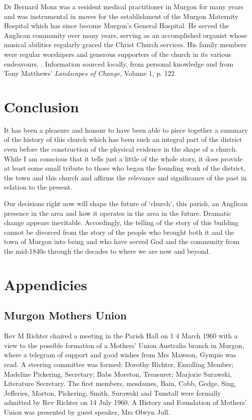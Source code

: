 Dr Bernard Monz was a resident medical practitioner in Murgon for many years and was instrumental in moves for the establishment of the Murgon Maternity Hospital which has since become Murgon's General Hospital. He served the Anglican community over many years, serving as an accomplished organist whose musical abilities regularly graced the Christ Church services. His family members were regular worshipers and generous supporters of the church in its various endeavours. . Information sourced locally, from personal knowledge and from Tony Matthews' \emph{Landscapes of Change,} Volume 1, p. 122

\hypertarget{conclusion}{%
\chapter{Conclusion}\label{conclusion}}

It has been a pleasure and honour to have been able to piece together a summary of the history of this church which has been such an integral part of the district even before the construction of the physical evidence in the shape of a church. While I am conscious that it tells just a little of the whole story, it does provide at least some small tribute to those who began the founding work of the district, the town and this church and affirms the relevance and significance of the past in relation to the present.

Our decisions right now will shape the future of `church', this parish, an Anglican presence in the area and how it operates in the area in the future. Dramatic change appears inevitable. Accordingly, the telling of the story of this building cannot be divorced from the story of the people who brought both it and the town of Murgon into being and who have served God and the community from the mid-1840s through the decades to where we are now and beyond.

\hypertarget{appendicies}{%
\chapter{Appendicies}\label{appendicies}}

\hypertarget{murgon-mothers-union}{%
\section{Murgon Mothers Union}\label{murgon-mothers-union}}

Rev M Richter chaired a meeting in the Parish Hall on 1 4 March 1960 with a view to the possible formation of a Mothers' Union Australia branch in Murgon, where a telegram of support and good wishes from Mrs Mawson, Gympie was read. A steering committee was formed: Dorothy Richter, Enrolling Member; Madeline Pickering, Secretary; Babs Moreton, Treasurer; Marjorie Surawski, Literature Secretary. The first members, mesdames, Bain, Cobb, Gedge, Sing, Jefferies, Morton, Pickering, Smith, Surawski and Tunstall were formally admitted by Rev Richter on 14 July 1960. A History and Foundation of Mothers' Union was presented by guest speaker, Mrs Olwyn Jull.

